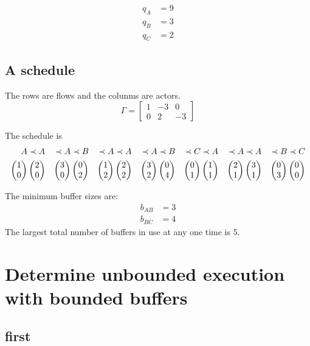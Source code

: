 \documentclass{article}
\begin{document}
\begin{align}
q_A & = 9  \\
q_B & = 3 \\
q_C & = 2
\end{align}

\subsection{A schedule}

The rows are flows and the colunms are actors.
\begin{equation}
\Gamma =
\begin{bmatrix}
1 & -3 & 0 \\
0 & 2 & -3
\end{bmatrix}
\end{equation}

The schedule is
\begin{align*}
A & \prec A & \prec A & \prec B & \prec
A & \prec A & \prec A & \prec B & \prec C & \prec
A & \prec A & \prec A & \prec B & \prec C \\
\cv{1}{0} & \cv{2}{0} & \cv{3}{0} & \cv{0}{2} &
\cv{1}{2} & \cv{2}{2} & \cv{3}{2} & \cv{0}{4} & \cv{0}{1} &
\cv{1}{1} & \cv{2}{1} & \cv{3}{1} & \cv{0}{3} & \cv{0}{0}
\end{align*}

The minimum buffer sizes are:
\begin{align}
b_{AB} & = 3  \\
b_{BC} & = 4
\end{align}
The largest total number of buffers in use at any one time is $5$.


\section{Determine unbounded execution with bounded buffers}

\subsection{first}

\end{document}

